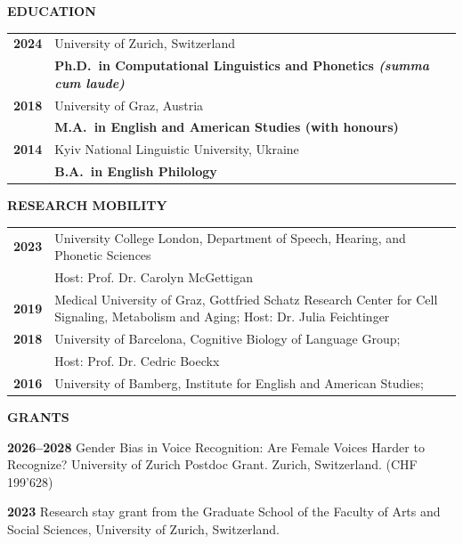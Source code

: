 \documentclass[11pt]{article}
\newcommand{\hangpara}{
 \setlength{\parindent}{0in} %
 \hangindent=0.42in %
}
\begin{document}
\vskip 12pt
\begin{flushleft}
{\bf EDUCATION}
\end{flushleft}
\begin{tabular}{lp{5.5in}}
\bf 2024 & University of Zurich, Switzerland \\
& \textbf{Ph.D.\ in Computational Linguistics and Phonetics \textit{(summa cum laude)}} \\
\bf 2018 & University of Graz, Austria \\
& \textbf{M.A.\ in English and American Studies (with honours)} \\
\bf 2014 & Kyiv National Linguistic University, Ukraine \\
& \textbf{B.A.\ in English Philology} \\
\end{tabular}


\vskip 12pt
\begin{flushleft}
{\bf RESEARCH MOBILITY}
\end{flushleft}
\begin{tabular}{lp{5.5in}}
\bf 2023 & University College London, Department of Speech, Hearing, and Phonetic Sciences \\
& Host: Prof. Dr. Carolyn McGettigan \\
\bf 2019 & Medical University of Graz, Gottfried Schatz Research Center for Cell Signaling, Metabolism and Aging; Host: Dr. Julia Feichtinger \\
\bf 2018 & University of Barcelona, Cognitive Biology of Language Group; \\
& Host: Prof. Dr. Cedric Boeckx \\
\bf 2016 & University of Bamberg, Institute for English and American Studies; \\ 
\end{tabular}



\vskip 20pt
\begin{flushleft}
{\bf GRANTS}
\end{flushleft}
\vskip 6pt
\hangpara
{\bf 2026--2028}\hspace{1ex} Gender Bias in Voice Recognition: Are Female Voices Harder to Recognize? University of Zurich Postdoc Grant. Zurich, Switzerland. (CHF 199'628)
\vskip 6pt
\hangpara
{\bf 2023}\hspace{1ex} Research stay grant from the Graduate School of the Faculty of Arts and Social Sciences, University of Zurich, Switzerland. %
\vskip 6pt
\hangpara
\end{document}
